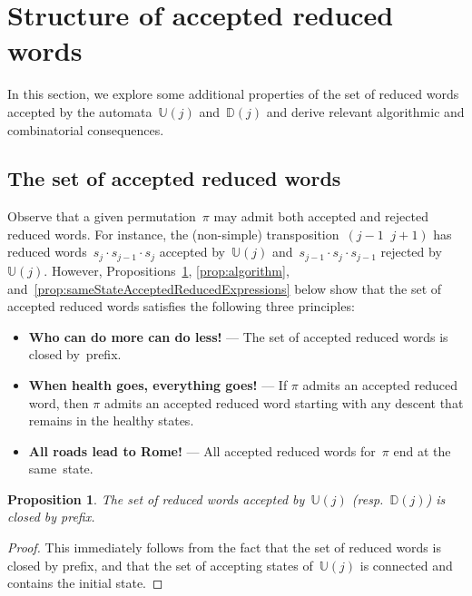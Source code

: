 \documentclass[11pt]{article}
\newtheorem{prop}[theo]{Proposition}
\theoremstyle{definition}
\numberwithin{equation}{section}
\newcommand{\automatonU}{\mathbb{U}}
\newcommand{\automatonD}{\mathbb{D}}
\begin{document}
\section{Structure of accepted reduced words}\label{sec:algorithmicCombinatorialConsequences}

In this section, we explore some additional properties of the set of reduced words accepted by the automata~$\automatonU(j)$ and~$\automatonD(j)$ and derive relevant algorithmic and combinatorial consequences.

\subsection{The set of accepted reduced words}\label{subsec:principles}

Observe that a given permutation~$\pi$ may admit both accepted and rejected reduced words.
For instance, the (non-simple) transposition~${(j-1 \;\; j+1)}$ has reduced words~$s_j \cdot s_{j-1} \cdot s_j$ accepted by~$\automatonU(j)$ and~$s_{j-1} \cdot s_j \cdot s_{j-1}$ rejected by~$\automatonU(j)$.
However, Propositions~\ref{prop:prefixesReducedExpressions}, \ref{prop:algorithm}, and~\ref{prop:sameStateAcceptedReducedExpressions} below show that the set of accepted reduced words satisfies the following three principles:
\begin{itemize}
	\item \textbf{Who can do more can do less!} --- The set of accepted reduced words is closed by~prefix.
	\item \textbf{When health goes, everything goes!} --- If $\pi$ admits an accepted reduced word, then $\pi$ admits an accepted reduced word starting with any descent that remains in the healthy states.
	\item \textbf{All roads lead to Rome!} --- All accepted reduced words for~$\pi$ end at the same~state.
\end{itemize}

\begin{prop}\label{prop:prefixesReducedExpressions}
The set of reduced words accepted by~$\automatonU(j)$ (resp.~$\automatonD(j)$) is closed by prefix.
\end{prop}

\begin{proof}
This immediately follows from the fact that the set of reduced words is closed by prefix, and that the set of accepting states of~$\automatonU(j)$ is connected and contains the initial state.
\end{proof}
\end{document}
